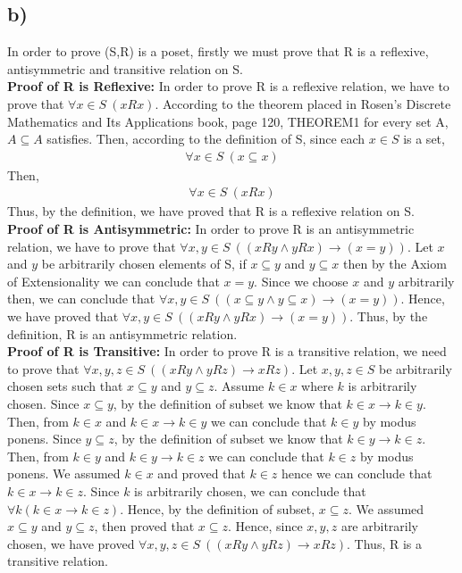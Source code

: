 \documentclass[11pt]{article}
\begin{document}
\subsection*{b)}
In order to prove (S,R) is a poset, firstly we must prove that R is a reflexive, antisymmetric and transitive relation on S. \\
\textbf{Proof of R is Reflexive:}
In order to prove R is a reflexive relation, we have to prove that $\forall x\in S \ (xRx)$. According to the theorem placed in Rosen's Discrete Mathematics and Its Applications book, page 120, THEOREM1 for every set A, $A \subseteq A$ satisfies. Then, according to the definition of S, since each $x\in S$ is a set,
\begin{equation*}
\begin{split}
\forall x\in S \ (x\subseteq x)
\end{split}
\end{equation*}
Then,
\begin{equation*}
\begin{split}
\forall x\in S \ (xRx)
\end{split}
\end{equation*}
Thus, by the definition, we have proved that R is a reflexive relation on S.\\
\textbf{Proof of R is Antisymmetric:}
In order to prove R is an antisymmetric relation, we have to prove that $\forall x,y\in S \ ((xRy \land yRx)\rightarrow(x=y))$. Let $x$ and $y$ be arbitrarily chosen elements of S, if $x \subseteq y$ and $y \subseteq x$ then by the Axiom of Extensionality we can conclude that $x = y$. Since we choose $x$ and $y$ arbitrarily then, we can conclude that $\forall x,y\in S \ ((x \subseteq y \land y\subseteq x)\rightarrow(x=y))$. Hence, we have proved that $\forall x,y\in S \ ((xRy \land yRx)\rightarrow(x=y))$. Thus, by the definition, R is an antisymmetric relation. \\
\textbf{Proof of R is Transitive:} In order to prove R is a transitive relation, we need to prove that $\forall x,y,z\in S \ ((xRy\land yRz) \rightarrow xRz)$. Let $x,y,z \in S$ be arbitrarily chosen sets such that $x \subseteq y$ and $y \subseteq z$. Assume $k \in x$ where $k$ is arbitrarily chosen. Since $x \subseteq y$, by the definition of subset we know that $k \in x \rightarrow k \in y$. Then, from $k \in x$ and $k \in x \rightarrow k \in y$ we can conclude that $k \in y$ by modus ponens.  Since $y \subseteq z$, by the definition of subset we know that $k \in y \rightarrow k \in z$. Then, from $k \in y$ and $k \in y \rightarrow k \in z$ we can conclude that $k \in z$ by modus ponens. We assumed $k \in x$ and proved that $k \in z$ hence we can conclude that $k \in x \rightarrow k \in z$. Since $k$ is arbitrarily chosen, we can conclude that $\forall k (k \in x \rightarrow k \in z)$. Hence, by the definition of subset, $x \subseteq z$. We assumed $x \subseteq y$ and $y \subseteq z$, then proved that $x \subseteq z$. Hence, since $x,y,z$ are arbitrarily chosen, we have proved $\forall x,y,z\in S \ ((xRy\land yRz) \rightarrow xRz)$. Thus, R is a transitive relation.\\
\end{document}
